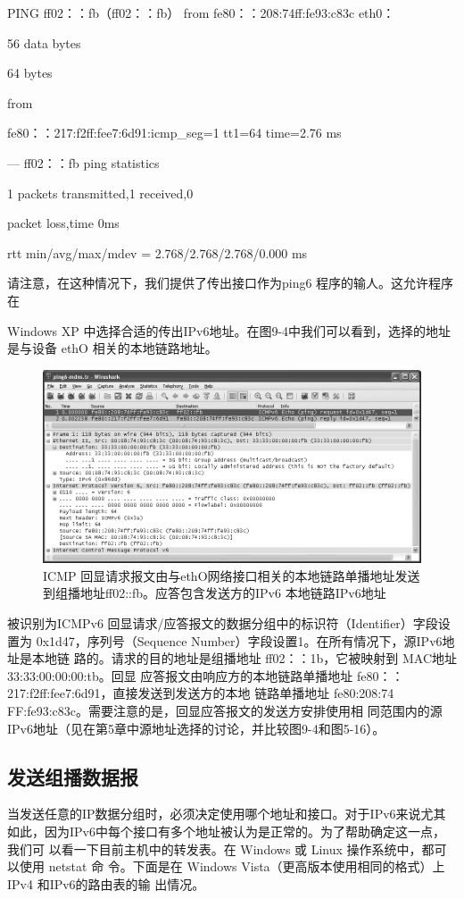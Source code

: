 PING ff02：：fb（ff02：：fb） from fe80：：208:74ff:fe93:c83c eth0：

56 data bytes

64 bytes

from

fe80：：217:f2ff:fee7:6d91:icmp\_seg=1 tt1=64 time=2.76 ms

--- ff02：：fb ping statistics

1 packets transmitted,1 received,0%

packet loss,time 0ms

rtt min/avg/max/mdev = 2.768/2.768/2.768/0.000 ms

请注意，在这种情况下，我们提供了传出接口作为ping6 程序的输人。这允许程序在

Windows XP 中选择合适的传出IPv6地址。在图9-4中我们可以看到，选择的地址是与设备
ethO 相关的本地链路地址。

\begin{figure}[ht]
    \centering
	\includegraphics[width=1\textwidth]{imgs/9/9-4.png}
	\caption{ICMP 回显请求报文由与ethO网络接口相关的本地链路单播地址发送到组播地址ff02::fb。应答包含发送方的IPv6 本地链路IPv6地址}
\end{figure}

被识别为ICMPv6 回显请求/应答报文的数据分组中的标识符（Identifier）字段设置为
0x1d47，序列号（Sequence Number）字段设置1。在所有情况下，源IPv6地址是本地链
路的。请求的目的地址是组播地址 ff02：：1b，它被映射到 MAC地址33:33:00:00:00:tb。回显
应答报文由响应方的本地链路单播地址 fe80：：217:f2ff:fee7:6d91，直接发送到发送方的本地
链路单播地址 fe80:208:74 FF:fe93:c83c。需要注意的是，回显应答报文的发送方安排使用相
同范围内的源 IPv6地址（见在第5章中源地址选择的讨论，并比较图9-4和图5-16）。

\subsection{发送组播数据报}
当发送任意的IP数据分组时，必须决定使用哪个地址和接口。对于IPv6来说尤其
如此，因为IPv6中每个接口有多个地址被认为是正常的。为了帮助确定这一点，我们可
以看一下目前主机中的转发表。在 Windows 或 Linux 操作系统中，都可以使用 netstat 命
令。下面是在 Windows Vista（更高版本使用相同的格式）上IPv4 和IPv6的路由表的输
出情况。

